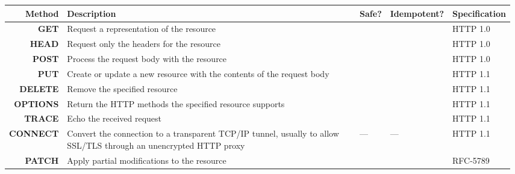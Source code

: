 \documentclass[final,table]{beamer}
\newcommand{\yes}{\color{green!60!black}{yes}}
\newcommand{\no}{\color{red}{no}}
\newcommand{\method}[1]{\textbf{#1}}
\begin{document}
\begin{frame}{}
    \begin{columns}
      \begin{column}{0.05\textwidth}
      \end{column}
      \begin{column}{0.9\textwidth}
        \begin{block}{}
          \Huge
          \begin{tabular}{r p{} l l l}
            Method & Description & Safe? & Idempotent? & Specification \\ \hline
            \method{GET} & Request a representation of the resource & \yes & \yes & HTTP 1.0 \\
            \method{HEAD} & Request only the headers for the resource & \yes & \yes &HTTP 1.0 \\
            \method{POST} & Process the request body with the resource & \no & \no & HTTP 1.0 \\
            \method{PUT} & Create or update a new resource with the contents of the request body & \no & \yes & HTTP 1.1 \\
            \method{DELETE} & Remove the specified resource & \no & \yes & HTTP 1.1 \\
            \method{OPTIONS} & Return the HTTP methods the specified resource supports & \yes & \yes & HTTP 1.1 \\
            \method{TRACE} & Echo the received request & \yes & \yes & HTTP 1.1 \\
            \method{CONNECT} & Convert the connection to a transparent TCP/IP tunnel, usually to allow SSL/TLS through an unencrypted HTTP proxy & --- & --- & HTTP 1.1 \\
            \method{PATCH} & Apply partial modifications to the resource & \no & \yes & RFC-5789 \\
          \end{tabular}
        \end{block}

        \vspace{0.5in}


\end{column}
\end{columns}
\end{frame}
\end{document}
